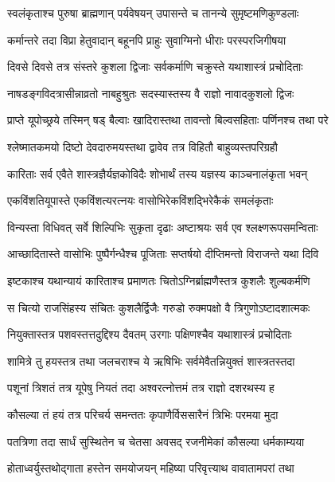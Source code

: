\twolineshloka
{स्वलंकृताश्च पुरुषा ब्राह्मणान् पर्यवेषयन्}
{उपासन्ते च तानन्ये सुमृष्टमणिकुण्डलाः} %

\twolineshloka
{कर्मान्तरे तदा विप्रा हेतुवादान् बहूनपि}
{प्राहुः सुवाग्मिनो धीराः परस्परजिगीषया} %

\twolineshloka
{दिवसे दिवसे तत्र संस्तरे कुशला द्विजाः}
{सर्वकर्माणि चक्रुस्ते यथाशास्त्रं प्रचोदिताः} %

\twolineshloka
{नाषडङ्गविदत्रासीन्नाव्रतो नाबहुश्रुतः}
{सदस्यास्तस्य वै राज्ञो नावादकुशलो द्विजः} %

\twolineshloka
{प्राप्ते यूपोच्छ्रये तस्मिन् षड् बैल्वाः खादिरास्तथा}
{तावन्तो बिल्वसहिताः पर्णिनश्च तथा परे} %

\twolineshloka
{श्लेष्मातकमयो दिष्टो देवदारुमयस्तथा}
{द्वावेव तत्र विहितौ बाहुव्यस्तपरिग्रहौ} %

\twolineshloka
{कारिताः सर्व एवैते शास्त्रज्ञैर्यज्ञकोविदैः}
{शोभार्थं तस्य यज्ञस्य काञ्चनालंकृता भवन्} %

\twolineshloka
{एकविंशतियूपास्ते एकविंशत्यरत्नयः}
{वासोभिरेकविंशद्भिरेकैकं समलंकृताः} %

\twolineshloka
{विन्यस्ता विधिवत् सर्वे शिल्पिभिः सुकृता दृढाः}
{अष्टाश्रयः सर्व एव श्लक्ष्णरूपसमन्विताः} %

\twolineshloka
{आच्छादितास्ते वासोभिः पुष्पैर्गन्धैश्च पूजिताः}
{सप्तर्षयो दीप्तिमन्तो विराजन्ते यथा दिवि} %

\twolineshloka
{इष्टकाश्च यथान्यायं कारिताश्च प्रमाणतः}
{चितोऽग्निर्ब्राह्मणैस्तत्र कुशलैः शुल्बकर्मणि} %

\twolineshloka
{स चित्यो राजसिंहस्य संचितः कुशलैर्द्विजैः}
{गरुडो रुक्मपक्षो वै त्रिगुणोऽष्टादशात्मकः} %

\twolineshloka
{नियुक्तास्तत्र पशवस्तत्तदुद्दिश्य दैवतम्}
{उरगाः पक्षिणश्चैव यथाशास्त्रं प्रचोदिताः} %

\twolineshloka
{शामित्रे तु हयस्तत्र तथा जलचराश्च ये}
{ऋषिभिः सर्वमेवैतन्नियुक्तं शास्त्रतस्तदा} %

\twolineshloka
{पशूनां त्रिशतं तत्र यूपेषु नियतं तदा}
{अश्वरत्नोत्तमं तत्र राज्ञो दशरथस्य ह} %

\twolineshloka
{कौसल्या तं हयं तत्र परिचर्य समन्ततः}
{कृपाणैर्विससारैनं त्रिभिः परमया मुदा} %

\twolineshloka
{पतत्रिणा तदा सार्धं सुस्थितेन च चेतसा}
{अवसद् रजनीमेकां कौसल्या धर्मकाम्यया} %

\twolineshloka
{होताध्वर्युस्तथोद्गाता हस्तेन समयोजयन्}
{महिष्या परिवृत्त्याथ वावातामपरां तथा} %

